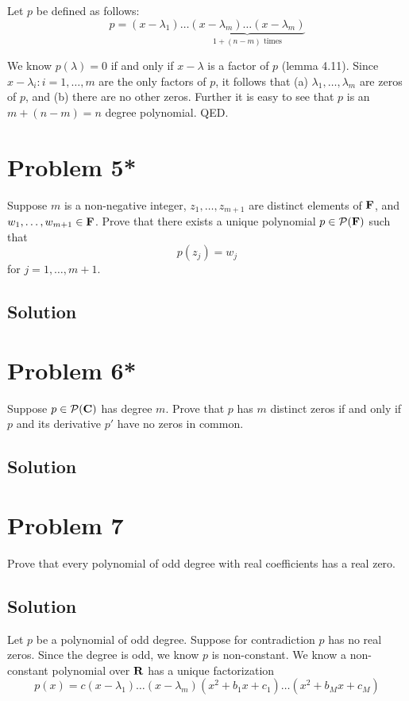 \documentclass{article}
\begin{document}
Let $p$ be defined as follows:
\[p=(x-\lambda_1)\ldots\underbrace{(x-\lambda_m)\ldots(x-\lambda_m)}_{1+(n-m)\text{ times}}\]

We know $p(\lambda)=0$ if and only if $x-\lambda$ is a factor of $p$ (lemma 4.11). Since $x-\lambda_i:i=1,\ldots,m$ are the only factors of $p$, it follows that (a) $\lambda_1,\ldots,\lambda_m$ are zeros of $p$, and (b) there are no other zeros. Further it is easy to see that $p$ is an $m+(n-m)=n$ degree polynomial. QED.

\section*{Problem 5*}
Suppose $m$ is a non-negative integer, $z_1,\ldots,z_{m+1}$ are distinct elements of $\mathbf{F}$, and $w_1,\ldots,w_{m+1}\in\mathbf{F}$. Prove that there exists a unique polynomial $p\in\mathcal{P}(\mathbf{F})$ such that
\[p(z_j)=w_j\]
for $j=1,\ldots,m+1$.

\subsection*{Solution}


\section*{Problem 6*}
Suppose $p\in\mathcal{P}(\mathbf{C})$ has degree $m$. Prove that $p$ has $m$ distinct zeros if and only if $p$ and its derivative $p'$ have no zeros in common.

\subsection*{Solution}

\section*{Problem 7}
Prove that every polynomial of odd degree with real coefficients has a real zero.

\subsection*{Solution}

Let $p$ be a polynomial of odd degree. Suppose for contradiction $p$ has no real zeros. Since the degree is odd, we know $p$ is non-constant. We know a non-constant polynomial over $\mathbf{R}$ has a unique factorization
\[p(x)=c(x-\lambda_1)\ldots(x-\lambda_m)(x^2+b_1x+c_1)\ldots(x^2+b_Mx+c_M)\]
\end{document}
